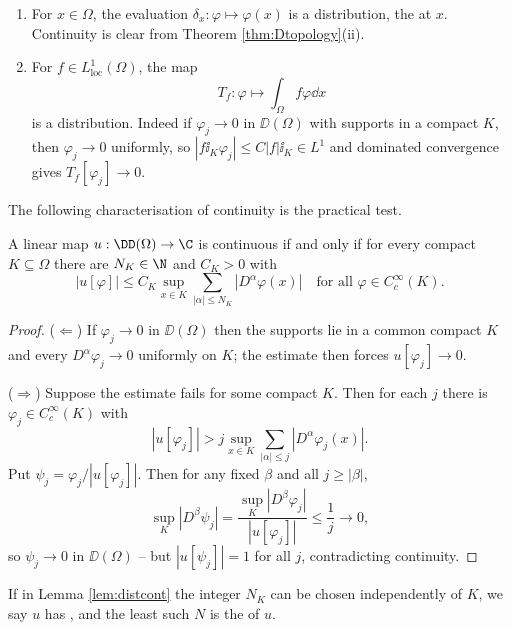 \begin{example}\label{ex:distributions}
	\begin{enumerate}[label=(\alph*)]
		\item For $x \in \Omega$, the evaluation $\delta_x : \varphi\mapsto\varphi(x)$ is a distribution, the  at $x$. Continuity is clear from Theorem \ref{thm:Dtopology}(ii).
		\item For $f \in L^1_{\mathrm{loc}}(\Omega)$, the map
		$$T_f : \varphi \mapsto \int_\Omega f\varphi \dd x$$
		is a distribution. Indeed if $\varphi_j\to 0$ in $\DD(\Omega)$ with supports in a compact $K$, then $\varphi_j\to0$ uniformly, so $|f\ii_K\varphi_j|\le C|f|\ii_K \in L^1$ and dominated convergence gives $T_f[\varphi_j]\to0$.
	\end{enumerate}
\end{example}

The following characterisation of continuity is the practical test.

\begin{lemma}\label{lem:distcont}
	A linear map $u : \DD(\Omega)\to\C$ is continuous if and only if for every compact $K\subseteq\Omega$ there are $N_K\in\N$ and $C_K>0$ with
	$$|u[\varphi]|\le C_K\sup_{x\in K}\sum_{|\alpha|\le N_K}|D^\alpha\varphi(x)| \quad \text{for all }\varphi\in C_c^\infty(K).$$
\end{lemma}

\begin{proof}
	($\Leftarrow$) If $\varphi_j\to0$ in $\DD(\Omega)$ then the supports lie in a common compact $K$ and every $D^\alpha \varphi_j\to0$ uniformly on $K$; the estimate then forces $u[\varphi_j]\to0$.

	($\Rightarrow$) Suppose the estimate fails for some compact $K$. Then for each $j$ there is $\varphi_j\in C_c^\infty(K)$ with
	$$|u[\varphi_j]|>j \sup_{x\in K}\sum_{|\alpha|\le j}|D^\alpha\varphi_j(x)|.$$
	Put $\psi_j=\varphi_j/|u[\varphi_j]|$. Then for any fixed $\beta$ and all $j \ge |\beta|$,
	$$\sup_K|D^\beta\psi_j| = \frac{\sup_K|D^\beta\varphi_j|}{|u[\varphi_j]|}\le\frac{1}{j}\to 0,$$
	so $\psi_j\to0$ in $\DD(\Omega)$ -- but $|u[\psi_j]|=1$ for all $j$, contradicting continuity.
\end{proof}

\begin{definition}[Order]
	If in Lemma \ref{lem:distcont} the integer $N_K$ can be chosen independently of $K$, we say $u$ has , and the least such $N$ is the  of $u$.
\end{definition}

